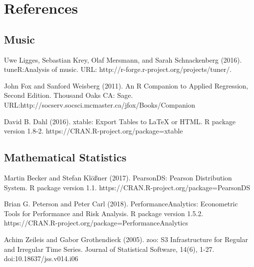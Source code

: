  \cite{key100}


\section{References}

\subsection{Music}

Uwe Ligges, Sebastian Krey, Olaf Mersmann, and Sarah Schnackenberg (2016). 
\newblock tuneR:Analysis of music. 
\newblock URL: http://r-forge.r-project.org/projects/tuner/.

John Fox and Sanford Weisberg (2011). 
\newblock An {R} Companion to Applied Regression, 
\newblock Second Edition. Thousand Oaks CA: Sage. URL:http://socserv.socsci.mcmaster.ca/jfox/Books/Companion

David B. Dahl (2016). 
\newblock xtable: Export Tables to LaTeX or HTML. 
\newblock R package version 1.8-2. https://CRAN.R-project.org/package=xtable

\subsection{Mathematical Statistics}

Martin Becker and Stefan Klößner (2017). 
\newblock PearsonDS: Pearson Distribution System. 
\newblock R package version 1.1. https://CRAN.R-project.org/package=PearsonDS

Brian G. Peterson and Peter Carl (2018). PerformanceAnalytics: Econometric Tools for
\newblock Performance and Risk Analysis. R package version 1.5.2.
\newblock https://CRAN.R-project.org/package=PerformanceAnalytics

 Achim Zeileis and Gabor Grothendieck (2005). 
\newblock zoo: S3 Infrastructure for Regular and Irregular Time Series. 
\newblock Journal of Statistical Software, 14(6), 1-27. doi:10.18637/jss.v014.i06


